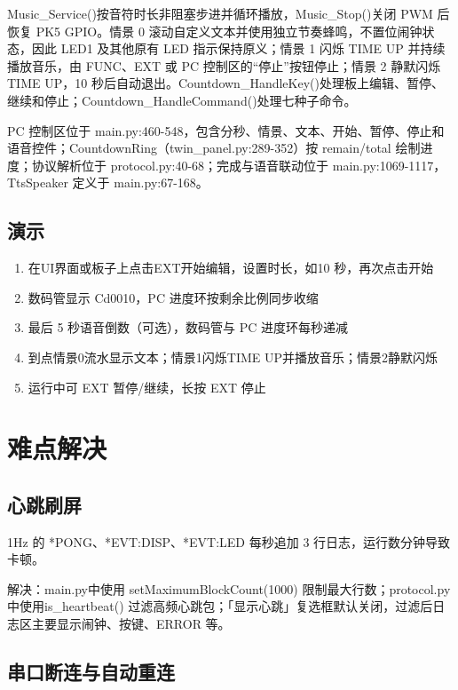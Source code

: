 \documentclass[11pt,a4paper]{article}
\begin{document}
Music\_Service()按音符时长非阻塞步进并循环播放，Music\_Stop()关闭 PWM 后恢复 PK5 GPIO。情景 0 滚动自定义文本并使用独立节奏蜂鸣，不置位闹钟状态，因此 LED1 及其他原有 LED 指示保持原义；情景 1 闪烁 TIME UP 并持续播放音乐，由 FUNC、EXT 或 PC 控制区的“停止”按钮停止；情景 2 静默闪烁 TIME UP，10 秒后自动退出。Countdown\_HandleKey()处理板上编辑、暂停、继续和停止；Countdown\_HandleCommand()处理七种子命令。

PC 控制区位于 main.py:460-548，包含分秒、情景、文本、开始、暂停、停止和语音控件；CountdownRing（twin\_panel.py:289-352）按 remain/total 绘制进度；协议解析位于 protocol.py:40-68；完成与语音联动位于 main.py:1069-1117，TtsSpeaker 定义于 main.py:67-168。

\subsection{演示}

\begin{enumerate}
  \item 在UI界面或板子上点击EXT开始编辑，设置时长，如10 秒，再次点击开始
  \item 数码管显示 Cd0010，PC 进度环按剩余比例同步收缩
  \item 最后 5 秒语音倒数（可选），数码管与 PC 进度环每秒递减
  \item 到点情景0流水显示文本；情景1闪烁TIME UP并播放音乐；情景2静默闪烁
  \item 运行中可 EXT 暂停/继续，长按 EXT 停止
\end{enumerate}

\section{难点解决}

\subsection{心跳刷屏}

1Hz 的 *PONG、*EVT:DISP、*EVT:LED 每秒追加 3 行日志，运行数分钟导致卡顿。

解决：main.py中使用 setMaximumBlockCount(1000) 限制最大行数；protocol.py中使用is\_heartbeat() 过滤高频心跳包；「显示心跳」复选框默认关闭，过滤后日志区主要显示闹钟、按键、ERROR 等。

\subsection{串口断连与自动重连}
\end{document}
